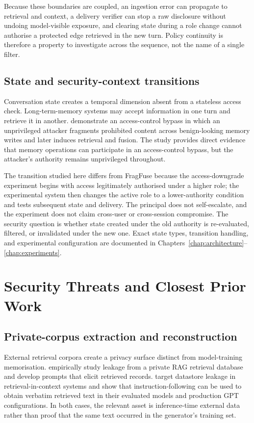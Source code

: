 Because these boundaries are coupled, an ingestion error can propagate to retrieval and context, a delivery verifier can stop a raw disclosure without undoing model-visible exposure, and clearing state during a role change cannot authorise a protected edge retrieved in the new turn. Policy continuity is therefore a property to investigate across the sequence, not the name of a single filter.

\subsection{State and security-context transitions}

Conversation state creates a temporal dimension absent from a stateless access check. Long-term-memory systems may accept information in one turn and retrieve it in another. \citet{rao2026fragfuse} demonstrate an access-control bypass in which an unprivileged attacker fragments prohibited content across benign-looking memory writes and later induces retrieval and fusion. The study provides direct evidence that memory operations can participate in an access-control bypass, but the attacker's authority remains unprivileged throughout.

The transition studied here differs from FragFuse because the access-downgrade experiment begins with access legitimately authorised under a higher role; the experimental system then changes the active role to a lower-authority condition and tests subsequent state and delivery. The principal does not self-escalate, and the experiment does not claim cross-user or cross-session compromise. The security question is whether state created under the old authority is re-evaluated, filtered, or invalidated under the new one. Exact state types, transition handling, and experimental configuration are documented in Chapters~\ref{chap:architecture}--\ref{chap:experiments}.

\section{Security Threats and Closest Prior Work}
\label{sec:background-threats}

\subsection{Private-corpus extraction and reconstruction}

External retrieval corpora create a privacy surface distinct from model-training memorisation. \citet{zeng2024ragprivacy} empirically study leakage from a private RAG retrieval database and develop prompts that elicit retrieved records. \citet{qi2025spill} target datastore leakage in retrieval-in-context systems and show that instruction-following can be used to obtain verbatim retrieved text in their evaluated models and production GPT configurations. In both cases, the relevant asset is inference-time external data rather than proof that the same text occurred in the generator's training set.

